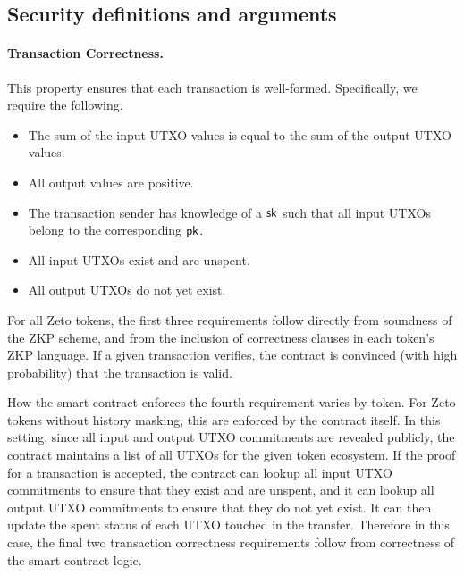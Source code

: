 

\subsection{Security definitions and arguments}

\paragraph{Transaction Correctness.} This property ensures that each transaction is well-formed. Specifically, we require the following.
\begin{itemize}
  \item The sum of the input UTXO values is equal to the sum of the output UTXO values.
  \item All output values are positive.
  \item The transaction sender has knowledge of a $\mathsf{sk}$ such that all input UTXOs belong to the corresponding $\mathsf{pk}$.
  \item All input UTXOs exist and are unspent.
  \item All output UTXOs do not yet exist.
\end{itemize}

For all Zeto tokens, the first three requirements follow directly from soundness of the ZKP scheme, and from the inclusion of correctness clauses in each token's ZKP language. If a given transaction verifies, the contract is convinced (with high probability) that the transaction is valid.

How the smart contract enforces the fourth requirement varies by token. For Zeto tokens without history masking, this are enforced by the contract itself. In this setting, since all input and output UTXO commitments are revealed publicly, the contract maintains a list of all UTXOs for the given token ecosystem. If the proof for a transaction is accepted, the contract can lookup all input UTXO commitments to ensure that they exist and are unspent, and it can lookup all output UTXO commitments to ensure that they do not yet exist. It can then update the spent status of each UTXO touched in the transfer. Therefore in this case, the final two transaction correctness requirements follow from correctness of the smart contract logic.

